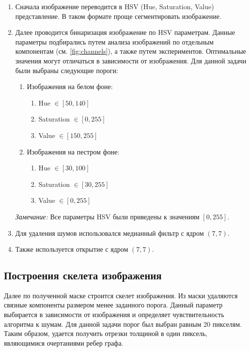\documentclass[11pt]{extarticle}
\begin{document}
\begin{enumerate}
  \item Сначала изображение переводится в HSV (Hue, Saturation, Value) представление. В таком формате проще сегментировать изображение.
  \item Далее проводится бинаризация изображение по HSV параметрам. Данные параметры подбирались путем анализа изображений по отдельным компонентам (см. \autoref{fig:channels}), а также путем экспериментов. Оптимальные значения могут отличаться в зависимости от изображения. Для данной задачи были выбраны следующие пороги:
  \begin{enumerate}
    \item Изображения на белом фоне:
    \begin{enumerate}
      \item Hue $\in [50, 140]$
      \item Saturation $\in [0, 255]$
      \item Value $\in [150, 255]$
    \end{enumerate}
    \item Изображения на пестром фоне:
    \begin{enumerate}
      \item Hue $\in [30, 100]$
      \item Saturation $\in [30, 255]$
      \item Value $\in [0, 255]$
    \end{enumerate}
  \end{enumerate}
  \textit{Замечание:} Все параметры HSV были приведены к значениям $[0, 255]$.
  \item Для удаления шумов использовался медианный фильтр с ядром $(7, 7)$.
  \item Также используется открытие с ядром $(7, 7)$.
\end{enumerate}

\subsection{Построения скелета изображения}
Далее по полученной маске строится скелет изображения. Из маски удаляются связные компоненты размером менее заданного порога. Данный параметр выбирается в зависимости от изображения и определяет чувствительность алгоритма к шумам. Для данной задачи порог был выбран равным 20 пикселям. Таким образом, удается получить отрезки толщиной в один пиксель, являющимися очертаниями ребер графа. 
\end{document}
